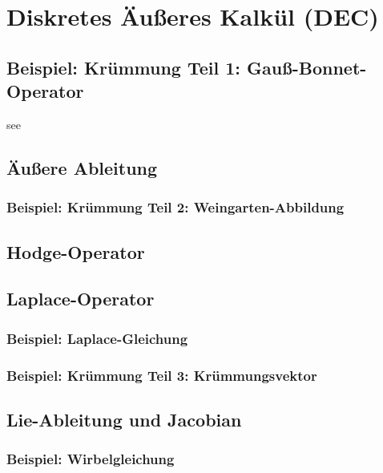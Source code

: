 \chapter{Diskretes Äußeres Kalkül (DEC)}

\section{Beispiel: Krümmung Teil 1: Gauß-Bonnet-Operator}
see \cite{Lee} \cite{FirstCourse}

\section{Äußere Ableitung}
  
  \subsection{Beispiel: Krümmung Teil 2: Weingarten-Abbildung}

\section{Hodge-Operator}

\section{Laplace-Operator}

  \subsection{Beispiel: Laplace-Gleichung}

  \subsection{Beispiel: Krümmung Teil 3: Krümmungsvektor}


\section{Lie-Ableitung und Jacobian}

  \subsection{Beispiel: Wirbelgleichung}



